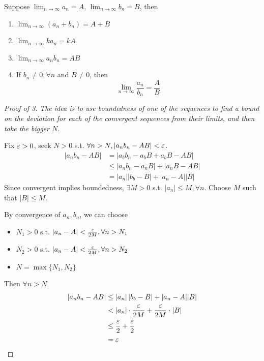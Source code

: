
\begin{theorem}
    Suppose 
    $\lim_{n \to \infty} a_n = A$,
    $\lim_{n \to \infty} b_n = B$, then 
    \begin{enumerate}
        \item $\lim_{n \to \infty}(a_n + b_n) = A + B$
        \item $\lim_{n \to \infty}ka_n = kA$
        \item $\lim_{n \to \infty}a_n b_n = AB$
        \item If $b_n \neq 0, \forall n$ and $B \neq 0$, then 
        \[
            \lim_{n \to \infty} \frac{a_n}{b_n} = \frac{A}{B}
        \]
    \end{enumerate}
\end{theorem}

\begin{proof}[Proof of 3]
    \textit{
        The idea is to use boundedness of one of the sequences to 
        find a bound on the deviation for each of the convergent sequences
        from their limits, and then take the bigger $N$.
    }
    \medskip

    Fix $\varepsilon > 0$, seek $N > 0$ s.t. $\forall n > N, \left| a_n b_n - AB \right| < \varepsilon $.
    \begin{align*}
        \left| a_n b_{n} - AB \right|  
        &= \left| a_{b}b_{n} - a_{b}B + a_{b}B - AB \right| \\
        &\leq \left| a_{n}b_{n} - a_{n}B \right| + \left| a_{n}B - AB \right| \\
        &= \left| a_{n} \right|  |b_{b} - B| + |a_{n} - A | |B|
    \end{align*}
    Since convergent implies boundedness, $\exists M > 0$ s.t. $| a_n | \leq M, \forall n$.
    Choose $M$ such that $|B| \leq M$. 
    \medskip

    By convergence of $a_n, b_n$, we can choose
    \begin{itemize}
        \item $N_1 > 0$ s.t. $|a_n - A | < \frac{\varepsilon}{2M}, \forall n > N_1$
        \item $N_2 > 0$ s.t. $|a_n - A | < \frac{\varepsilon}{2M}, \forall n > N_2$
        \item $N = \max \{ N_1, N_2 \} $
    \end{itemize} 
    Then $\forall n > N$
    \begin{align*}
        \left| a_n b_{n} - AB \right|  
        &\leq \left| a_{n} \right|  |b_{b} - B| + |a_{n} - A | |B| \\
        &< |a_n | \cdot \frac{\varepsilon}{2M} + \frac{\varepsilon}{2M} \cdot |B| \\
        & \leq \frac{\varepsilon}{2} + \frac{\varepsilon}{2} \\
        &= \varepsilon
    \end{align*}
\end{proof}

